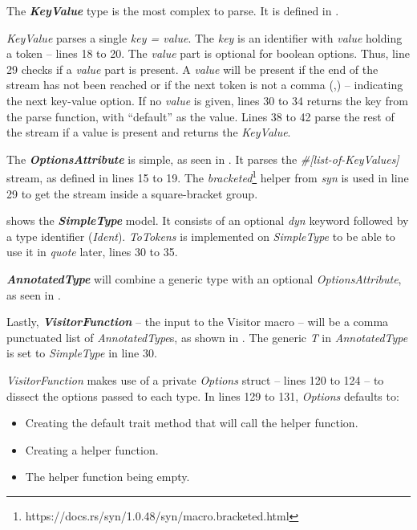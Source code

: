 The \textbf{\textit{KeyValue}} type is the most complex to parse.
It is defined in .

\textit{KeyValue} parses a single \textit{key = value}.
The \textit{key} is an identifier with \textit{value} holding a token -- lines 18 to 20.
The \textit{value} part is optional for boolean options.
Thus, line 29 checks if a \textit{value} part is present.
A \textit{value} will be present if the end of the stream has not been reached or if the next token is not a comma (,) -- indicating the next key-value option.
If no \textit{value} is given, lines 30 to 34 returns the key from the parse function, with ``default'' as the value.
Lines 38 to 42 parse the rest of the stream if a value is present and returns the \textit{KeyValue}.

The \textbf{\textit{OptionsAttribute}} is simple, as seen in .
It parses the \textit{\#[list-of-KeyValues]} stream, as defined in lines 15 to 19.
The \textit{bracketed}\footnote{https://docs.rs/syn/1.0.48/syn/macro.bracketed.html} helper from \textit{syn} is used in line 29 to get the stream inside a square-bracket group.

 shows the \textbf{\textit{SimpleType}} model.
It consists of an optional \textit{dyn} keyword followed by a type identifier (\textit{Ident}).
\textit{ToTokens} is implemented on \textit{SimpleType} to be able to use it in \textit{quote} later, lines 30 to 35.

\textbf{\textit{AnnotatedType}} will combine a generic type with an optional \textit{OptionsAttribute}, as seen in .


Lastly, \textbf{\textit{VisitorFunction}} -- the input to the Visitor macro -- will be a comma punctuated list of \textit{AnnotatedType}s, as shown in .
The generic \textit{T} in \textit{AnnotatedType} is set to \textit{SimpleType} in line 30.

\textit{VisitorFunction} makes use of a private \textit{Options} struct -- lines 120 to 124 -- to dissect the options passed to each type.
In lines 129 to 131, \textit{Options} defaults to:

\begin{itemize}
	\item Creating the default trait method that will call the helper function.
	\item Creating a helper function.
	\item The helper function being empty.
\end{itemize}

